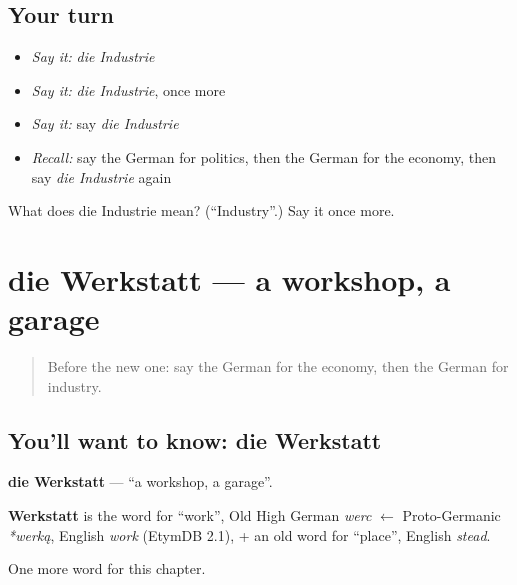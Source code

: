 \subsection*{Your turn}
\begin{itemize}
\raggedright
  \item \emph{Say it:} \emph{die Industrie}
  \item \emph{Say it:} \emph{die Industrie}, once more
  \item \emph{Say it:} say \emph{die Industrie}
  \item \emph{Recall:} say the German for politics, then the German for the economy, then say \emph{die Industrie} again
\end{itemize}

\begin{tcolorbox}[breakable,colback=teal!4,colframe=teal!35!black,title={Before you move on}]
What does die Industrie mean? (\textquotedblleft{}Industry\textquotedblright{}.) Say it once more.
\end{tcolorbox}
\section[die Werkstatt]{die Werkstatt — a workshop, a garage}

\label{lesson:GE-C210-werkstatt}



\begin{quote}
Before the new one: say the German for the economy, then the German for industry.
\end{quote}

\subsection*{You'll want to know: die Werkstatt}
\textbf{die Werkstatt} — \textquotedblleft{}a workshop, a garage\textquotedblright{}.

\begin{cousinweb}
\textbf{Werkstatt} is the word for \textquotedblleft{}work\textquotedblright{}, Old High German \emph{werc} $\leftarrow$ Proto-Germanic \emph{*werką}, English \emph{work} (EtymDB 2.1), + an old word for \textquotedblleft{}place\textquotedblright{}, English \emph{stead}.
\end{cousinweb}

\begin{grammarlens}[title={What you've built}]
One more word for this chapter.
\end{grammarlens}

